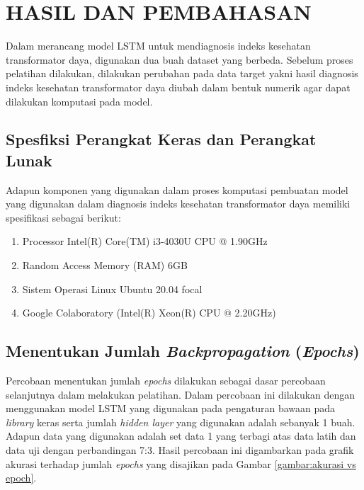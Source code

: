 \chapter{HASIL DAN PEMBAHASAN}
\label{BAB4:hasil}

Dalam merancang model LSTM untuk mendiagnosis indeks kesehatan transformator daya, digunakan dua buah dataset yang berbeda. Sebelum proses pelatihan dilakukan, dilakukan perubahan pada data target yakni hasil diagnosis indeks kesehatan transformator daya diubah dalam bentuk numerik agar dapat dilakukan komputasi pada model. 
\section{Spesfiksi Perangkat Keras dan Perangkat Lunak}
Adapun komponen yang digunakan dalam proses komputasi pembuatan model yang digunakan dalam diagnosis indeks kesehatan transformator daya memiliki spesifikasi sebagai berikut:
\begin{enumerate}
	\setlength{\itemsep}{0pt}%
	\item Processor Intel(R) Core(TM) i3-4030U CPU @ 1.90GHz
	\item Random Access Memory (RAM) 6GB
	\item Sistem Operasi Linux Ubuntu 20.04 focal
	\item Google Colaboratory (Intel(R) Xeon(R) CPU @ 2.20GHz)
\end{enumerate}

\section{Menentukan Jumlah \textit{Backpropagation} (\textit{Epochs})}
Percobaan menentukan jumlah \textit{epochs} dilakukan sebagai dasar percobaan selanjutnya dalam melakukan pelatihan. Dalam percobaan ini dilakukan dengan menggunakan model LSTM yang digunakan pada pengaturan bawaan pada \textit{library} keras serta jumlah \textit{hidden layer} yang digunakan adalah sebanyak 1 buah. Adapun data yang digunakan adalah set data 1 yang terbagi atas data latih dan data uji dengan perbandingan 7:3. Hasil percobaan ini digambarkan pada grafik akurasi terhadap jumlah \textit{epochs} yang disajikan pada Gambar \ref{gambar:akurasi vs epoch}. 

\begin{minipage}{\textwidth}
	\centering
	\label{gambar:akurasi vs epoch}
\end{minipage}

